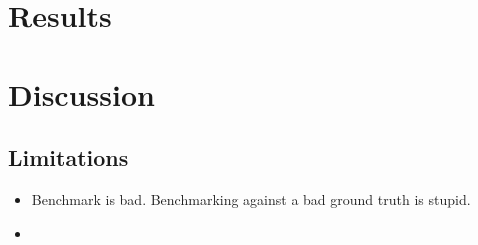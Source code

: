 
\section{Results}

\section{Discussion}

\subsection{Limitations}
\begin{itemize}
    \item Benchmark is bad. Benchmarking against a bad ground truth is stupid.
    \item 
\end{itemize}